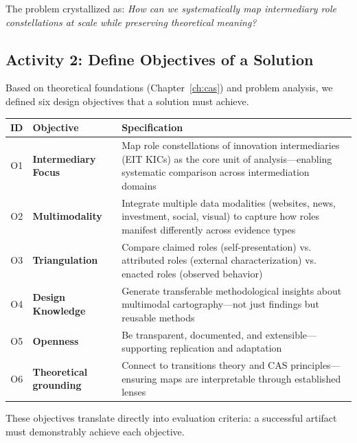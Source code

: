 \documentclass[../main.tex]{subfiles}
\begin{document}
The problem crystallized as: \emph{How can we systematically map intermediary role constellations at scale while preserving theoretical meaning?}

\subsection{Activity 2: Define Objectives of a Solution}

Based on theoretical foundations (Chapter~\ref{ch:cas}) and problem analysis, we defined six design objectives that a solution must achieve.

\tableminimal
\begin{center}
\begin{tabular}{@{}cp{2.5cm}p{7cm}@{}}
\toprule
\textbf{ID} & \textbf{Objective} & \textbf{Specification} \\
\midrule
O1 & \textbf{Intermediary Focus} & Map role constellations of innovation intermediaries (EIT KICs) as the core unit of analysis---enabling systematic comparison across intermediation domains \\
O2 & \textbf{Multimodality} & Integrate multiple data modalities (websites, news, investment, social, visual) to capture how roles manifest differently across evidence types \\
O3 & \textbf{Triangulation} & Compare claimed roles (self-presentation) vs. attributed roles (external characterization) vs. enacted roles (observed behavior) \\
O4 & \textbf{Design Knowledge} & Generate transferable methodological insights about multimodal cartography---not just findings but reusable methods \\
O5 & \textbf{Openness} & Be transparent, documented, and extensible---supporting replication and adaptation \\
O6 & \textbf{Theoretical grounding} & Connect to transitions theory and CAS principles---ensuring maps are interpretable through established lenses \\
\bottomrule
\end{tabular}
\end{center}

These objectives translate directly into evaluation criteria: a successful artifact must demonstrably achieve each objective.
\end{document}
